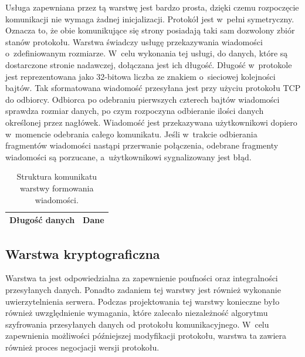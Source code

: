 Usługa zapewniana przez tą warstwę jest bardzo prosta, dzięki czemu
rozpoczęcie komunikacji nie wymaga żadnej inicjalizacji. Protokół jest
w~pełni symetryczny. Oznacza to, że obie komunikujące się strony
posiadają taki sam dozwolony zbiór stanów protokołu. Warstwa świadczy
usługę przekazywania wiadomości o~zdefiniowanym rozmiarze. W~celu
wykonania tej usługi, do danych, które są dostarczone stronie
nadawczej, dołączana jest ich długość. Długość w~protokole jest
reprezentowana jako 32-bitowa liczba ze znakiem o~sieciowej kolejności
bajtów. Tak sformatowana wiadomość przesyłana jest przy użyciu
protokołu TCP do odbiorcy. Odbiorca po odebraniu pierwszych czterech
bajtów wiadomości sprawdza rozmiar danych, po czym rozpoczyna
odbieranie ilości danych określonej przez nagłówek. Wiadomość jest
przekazywana użytkownikowi dopiero w~momencie odebrania całego
komunikatu. Jeśli w~trakcie odbierania fragmentów wiadomości nastąpi
przerwanie połączenia, odebrane fragmenty wiadomości są porzucane,
a~użytkownikowi sygnalizowany jest błąd.

\begin{table}[H]
\centering
\caption{Struktura komunikatu warstwy formowania wiadomości.}

\begin{tabular}{|p{3cm}|p{6cm}|}
\hline
Długość danych & Dane\\
\hline
\end{tabular}
\end{table}

\subsection[Warstwa kryptograficzna][Warstwa kryptograficzna]{Warstwa kryptograficzna}

Warstwa ta jest odpowiedzialna za zapewnienie poufności oraz
integralności przesyłanych danych. Ponadto zadaniem tej warstwy jest
również wykonanie uwierzytelnienia serwera. Podczas projektowania tej
warstwy konieczne było również uwzględnienie wymagania, które zalecało
niezależność algorytmu szyfrowania przesyłanych danych od protokołu
komunikacyjnego. W~celu zapewnienia możliwości późniejszej modyfikacji
protokołu, warstwa ta zawiera również proces negocjacji wersji
protokołu.

